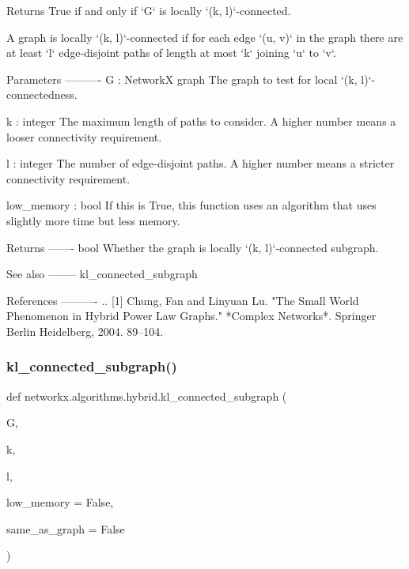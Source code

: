 \begin{DoxyVerb}Returns True if and only if `G` is locally `(k, l)`-connected.

A graph is locally `(k, l)`-connected if for each edge `(u, v)` in the
graph there are at least `l` edge-disjoint paths of length at most `k`
joining `u` to `v`.

Parameters
----------
G : NetworkX graph
    The graph to test for local `(k, l)`-connectedness.

k : integer
    The maximum length of paths to consider. A higher number means a looser
    connectivity requirement.

l : integer
    The number of edge-disjoint paths. A higher number means a stricter
    connectivity requirement.

low_memory : bool
    If this is True, this function uses an algorithm that uses slightly
    more time but less memory.

Returns
-------
bool
    Whether the graph is locally `(k, l)`-connected subgraph.

See also
--------
kl_connected_subgraph

References
----------
.. [1] Chung, Fan and Linyuan Lu. "The Small World Phenomenon in Hybrid
       Power Law Graphs." *Complex Networks*. Springer Berlin Heidelberg,
       2004. 89--104.\end{DoxyVerb}
 \mbox{\label{namespacenetworkx_1_1algorithms_1_1hybrid_a60a2f68aaa5743b5c042b8b038b716df}} 
\subsubsection{\texorpdfstring{kl\+\_\+connected\+\_\+subgraph()}{kl\_connected\_subgraph()}}
{\footnotesize\ttfamily def networkx.\+algorithms.\+hybrid.\+kl\+\_\+connected\+\_\+subgraph (\begin{DoxyParamCaption}\item[{}]{G,  }\item[{}]{k,  }\item[{}]{l,  }\item[{}]{low\+\_\+memory = {\ttfamily False},  }\item[{}]{same\+\_\+as\+\_\+graph = {\ttfamily False} }\end{DoxyParamCaption})}

